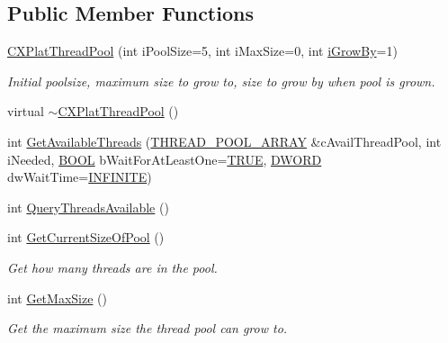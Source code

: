 \subsection*{\-Public \-Member \-Functions}
\begin{DoxyCompactItemize}
\item 
\hyperlink{class_c_x_plat_thread_pool_ad61cd31f1738bf2f33b2750fbe159c3f}{\-C\-X\-Plat\-Thread\-Pool} (int i\-Pool\-Size=5, int i\-Max\-Size=0, int \hyperlink{class_c_x_plat_thread_pool_af241301a871a1468678540d48fcc9985}{i\-Grow\-By}=1)
\begin{DoxyCompactList}\small\item\em \-Initial poolsize, maximum size to grow to, size to grow by when pool is grown. \end{DoxyCompactList}\item 
virtual \hyperlink{class_c_x_plat_thread_pool_a9b6e9f0aa858efb30e8afa85b9c39927}{$\sim$\-C\-X\-Plat\-Thread\-Pool} ()
\item 
int \hyperlink{class_c_x_plat_thread_pool_a9860a0943a82da693bd4f6465286faf6}{\-Get\-Available\-Threads} (\hyperlink{_c_x_plat_thread_pool_8h_a615ef31b69376a699fb98bdaa7a643af}{\-T\-H\-R\-E\-A\-D\-\_\-\-P\-O\-O\-L\-\_\-\-A\-R\-R\-A\-Y} \&c\-Avail\-Thread\-Pool, int i\-Needed, \hyperlink{_cpclient_8h_a3be13892ae7076009afcf121347dd319}{\-B\-O\-O\-L} b\-Wait\-For\-At\-Least\-One=\hyperlink{_x_plat_8h_aa8cecfc5c5c054d2875c03e77b7be15d}{\-T\-R\-U\-E}, \hyperlink{_x_plat_8h_aa39b39d94407451a6ec0226479db68cf}{\-D\-W\-O\-R\-D} dw\-Wait\-Time=\hyperlink{_x_plat_8h_aa84a29002ab81c719c0d07bb446296e0}{\-I\-N\-F\-I\-N\-I\-T\-E})
\item 
int \hyperlink{class_c_x_plat_thread_pool_a1f3073246e156c9a05ff392b968d533a}{\-Query\-Threads\-Available} ()
\item 
int \hyperlink{class_c_x_plat_thread_pool_a876bc703a2bd754d8171e8260d7e9468}{\-Get\-Current\-Size\-Of\-Pool} ()
\begin{DoxyCompactList}\small\item\em \-Get how many threads are in the pool. \end{DoxyCompactList}\item 
int \hyperlink{class_c_x_plat_thread_pool_a2d85a86f85582d5e87e35c11e6e34e49}{\-Get\-Max\-Size} ()
\begin{DoxyCompactList}\small\item\em \-Get the maximum size the thread pool can grow to. \end{DoxyCompactList}\item 

\end{DoxyCompactItemize}
